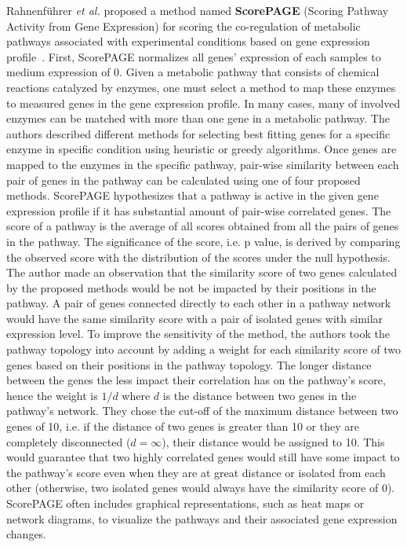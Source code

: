 Rahnenf{\"u}hrer \textit{et al.} proposed a method named \textbf{ScorePAGE} (Scoring Pathway Activity from Gene Expression) for scoring the co-regulation of metabolic pathways associated with experimental conditions based on gene expression profile~\cite{Rahnenfuhrer:2004}. 
First, ScorePAGE normalizes all genes' expression of each samples to medium expression of 0.
Given a metabolic pathway that consists of chemical reactions catalyzed by enzymes, one must select a method to map these enzymes to measured genes in the gene expression profile.
In many cases, many of involved enzymes can be matched with more than one gene in a metabolic pathway.
The authors described different methods for selecting best fitting genes for a specific enzyme in specific condition using heuristic or greedy algorithms.
Once genes are mapped to the enzymes in the specific pathway, pair-wise similarity between each pair of genes in the pathway can be calculated using one of four proposed methods.
ScorePAGE hypothesizes that a pathway is active in the given gene expression profile if it has substantial amount of pair-wise correlated genes.
The score of a pathway is the average of all scores obtained from all the pairs of genes in the pathway.
The significance of the score, i.e. p value, is derived by comparing the observed score with the distribution of the scores under the null hypothesis.
The author made an observation that the similarity score of two genes calculated by the proposed methods would be not be impacted by their positions in the pathway.
A pair of genes connected directly to each other in a pathway network would have the same similarity score with a pair of isolated genes with similar expression level.
To improve the sensitivity of the method, the authors took the pathway topology into account by adding a weight for each similarity score of two genes based on their positions in the pathway topology. The longer distance between the genes the less impact their correlation has on the pathway's score, hence the weight is $1/d$ where $d$ is the distance between two genes in the pathway's network.
They chose the cut-off of the maximum distance between two genes of 10, i.e. if the distance of two genes is greater than 10 or they are completely disconnected ($d = \infty$), their distance would be assigned to 10.
This would guarantee that two highly correlated genes would still have some impact to the pathway's score even when they are at great distance or isolated from each other (otherwise, two isolated genes would always have the similarity score of 0). 
ScorePAGE often includes graphical representations, such as heat maps or network diagrams, to visualize the pathways and their associated gene expression changes.

